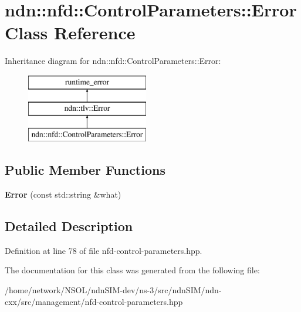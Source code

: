 \hypertarget{classndn_1_1nfd_1_1ControlParameters_1_1Error}{}\section{ndn\+:\+:nfd\+:\+:Control\+Parameters\+:\+:Error Class Reference}
\label{classndn_1_1nfd_1_1ControlParameters_1_1Error}
Inheritance diagram for ndn\+:\+:nfd\+:\+:Control\+Parameters\+:\+:Error\+:\begin{figure}[H]
\begin{center}
\leavevmode
\includegraphics[height=3.000000cm]{classndn_1_1nfd_1_1ControlParameters_1_1Error}
\end{center}
\end{figure}
\subsection*{Public Member Functions}
\begin{DoxyCompactItemize}
\item 
{\bfseries Error} (const std\+::string \&what)\hypertarget{classndn_1_1nfd_1_1ControlParameters_1_1Error_ab571cf4b867e64e03dd7d3f34319861a}{}\label{classndn_1_1nfd_1_1ControlParameters_1_1Error_ab571cf4b867e64e03dd7d3f34319861a}

\end{DoxyCompactItemize}


\subsection{Detailed Description}


Definition at line 78 of file nfd-\/control-\/parameters.\+hpp.



The documentation for this class was generated from the following file\+:\begin{DoxyCompactItemize}
\item 
/home/network/\+N\+S\+O\+L/ndn\+S\+I\+M-\/dev/ns-\/3/src/ndn\+S\+I\+M/ndn-\/cxx/src/management/nfd-\/control-\/parameters.\+hpp\end{DoxyCompactItemize}
